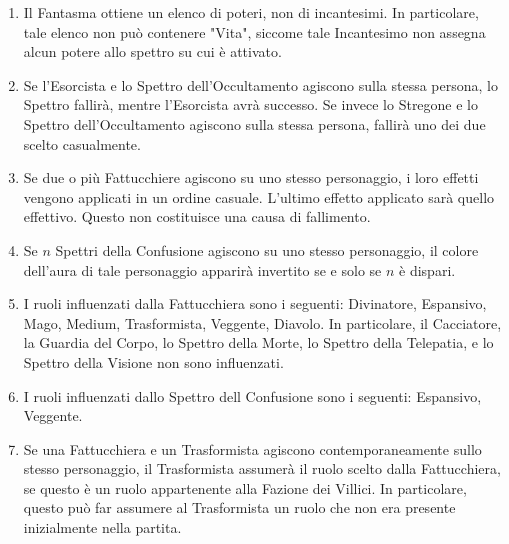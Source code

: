 \documentclass[a4paper,10pt]{article}
\begin{document}
\begin{enumerate}
	\item Il Fantasma ottiene un elenco di poteri, non di incantesimi. In particolare, tale elenco non può contenere "Vita", siccome tale Incantesimo non assegna alcun potere allo spettro su cui è attivato.

	\item Se l'Esorcista e lo Spettro dell'Occultamento agiscono sulla stessa persona, lo Spettro fallirà, mentre l'Esorcista avrà successo. Se invece lo Stregone e lo Spettro dell'Occultamento agiscono sulla stessa persona, fallirà uno dei due scelto casualmente.

	\item Se due o più Fattucchiere agiscono su uno stesso personaggio, i loro effetti vengono applicati in un ordine casuale. L'ultimo effetto applicato sarà quello effettivo. Questo non costituisce una causa di fallimento.

	\item Se $n$ Spettri della Confusione agiscono su uno stesso personaggio, il colore dell'aura di tale personaggio apparirà invertito se e solo se $n$ è dispari.

	\item I ruoli influenzati dalla Fattucchiera sono i seguenti: Divinatore, Espansivo, Mago, Medium, Trasformista, Veggente, Diavolo. In particolare, il Cacciatore, la Guardia del Corpo, lo Spettro della Morte, lo Spettro della Telepatia, e lo Spettro della Visione non sono influenzati.

	\item I ruoli influenzati dallo Spettro dell Confusione sono i seguenti: Espansivo, Veggente.

	\item Se una Fattucchiera e un Trasformista agiscono contemporaneamente sullo stesso personaggio, il Trasformista assumerà il ruolo scelto dalla Fattucchiera, se questo è un ruolo appartenente alla Fazione dei Villici. In particolare, questo può far assumere al Trasformista un ruolo che non era presente inizialmente nella partita.


\end{enumerate}
\end{document}
